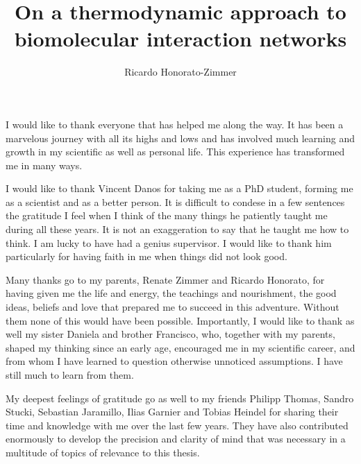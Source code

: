 \documentclass[phd,lfcs]{infthesis}
\title{On a thermodynamic approach to
  biomolecular interaction networks}
\author{Ricardo Honorato-Zimmer}
\begin{document}
\begin{preliminary}

\maketitle


\begin{acknowledgements}
  \vspace{.1cm}
  I would like to thank everyone that has helped me along the way.
  It has been a marvelous journey with all its highs and lows
  and has involved much learning and growth
  in my scientific as well as personal life.
  This experience has transformed me in many ways.

  I would like to thank Vincent Danos for taking me as a PhD student,
  forming me as a scientist and as a better person.
  It is difficult to condese in a few sentences the gratitude I feel
  when I think of the many things
  he patiently taught me during all these years.
  It is not an exaggeration to say that he taught me how to think.
  I am lucky to have had a genius supervisor.
  I would like to thank him particularly for having faith in me
  when things did not look good.

  Many thanks go to my parents,
  Renate Zimmer and Ricardo Honorato,
  for having given me the life and energy,
  the teachings and nourishment,
  the good ideas, beliefs and love that
  prepared me to succeed in this adventure.
  Without them none of this would have been possible.
  Importantly, I would like to thank as well
  my sister Daniela and brother Francisco,
  who, together with my parents,
  shaped my thinking since an early age,
  encouraged me in my scientific career,
  and from whom I have learned to question
  otherwise unnoticed assumptions.
  I have still much to learn from them.

  My deepest feelings of gratitude go as well
  to my friends Philipp Thomas, Sandro Stucki,
  Sebastian Jaramillo, Ilias Garnier and Tobias Heindel
  for sharing their time and knowledge
  with me over the last few years.
  They have also contributed enormously
  to develop the precision and clarity of mind
  that was necessary
  in a multitude of topics of relevance to this thesis.


\end{acknowledgements}
\end{preliminary}
\end{document}
